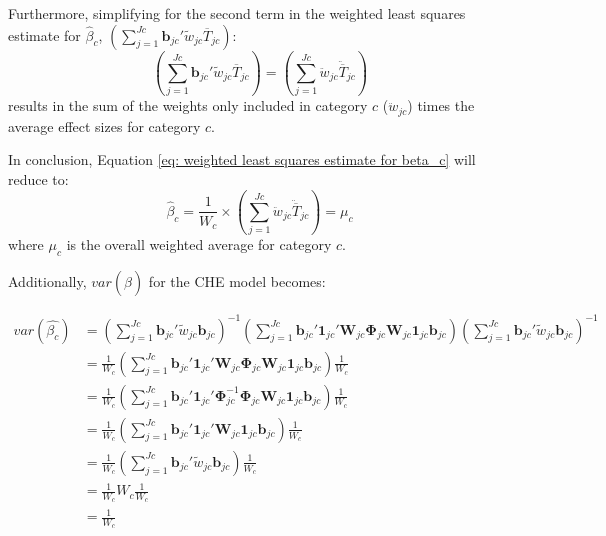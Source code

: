 Furthermore, simplifying for the second term in the weighted least squares estimate for $\hat{\beta}_c$, $\left(\sum_{j=1}^{Jc}\mathbf{b}_{jc}'\tilde{w}_{jc}\overline{T}_{jc} \right)$:
\begin{equation}
    \left(\sum_{j=1}^{Jc}\mathbf{b}_{jc}'\tilde{w}_{jc}\overline{T}_{jc} \right) = \left(\sum_{j=1}^{Jc} \ddot{w}_{jc} \ddot{\overline{T}}_{jc}\right) 
    \nonumber
\end{equation}
results in the sum of the weights only included in category $c$ ($\ddot{w}_{jc}$) times the average effect sizes for category $c$.

In conclusion, Equation \ref{eq: weighted least squares estimate for beta_c} will reduce to:
\begin{equation}
    \hat{\beta}_c = \frac{1}{W_c} \times \left(\sum_{j=1}^{Jc} \ddot{w}_{jc} \ddot{\overline{T}}_{jc}\right) = \mu_c
\end{equation}
where $\mu_c$ is the overall weighted average for category $c$.

Additionally, $var(\hat{\beta})$ for the CHE model becomes:

\begin{equation}
    \begin{split}
        var(\hat{\beta_c}) & = \left(\sum_{j=1}^{Jc}\mathbf{b}_{jc}'\tilde{w}_{jc} \mathbf{b}_{jc} \right)^{-1} \left(\sum_{j=1}^{Jc} \mathbf{b}_{jc}' \mathbf{1}_{jc}'\mathbf{W}_{jc} \mathbf{\Phi}_{jc} \mathbf{W}_{jc}\mathbf{1}_{jc}\mathbf{b}_{jc}   \right)\left(\sum_{j=1}^{Jc}\mathbf{b}_{jc}'\tilde{w}_{jc} \mathbf{b}_{jc} \right)^{-1} \\ 
        & = \frac{1}{W_c} \left(\sum_{j=1}^{Jc} \mathbf{b}_{jc}' \mathbf{1}_{jc}'\mathbf{W}_{jc} \mathbf{\Phi}_{jc} \mathbf{W}_{jc}\mathbf{1}_{jc}\mathbf{b}_{jc}   \right)\frac{1}{W_c} \\
        & = \frac{1}{W_c} \left(\sum_{j=1}^{Jc} \mathbf{b}_{jc}' \mathbf{1}_{jc}'\mathbf{\Phi}_{jc}^{-1} \mathbf{\Phi}_{jc} \mathbf{W}_{jc}\mathbf{1}_{jc}\mathbf{b}_{jc}   \right)\frac{1}{W_c} \\ 
        & = \frac{1}{W_c} \left(\sum_{j=1}^{Jc} \mathbf{b}_{jc}' \mathbf{1}_{jc}' \mathbf{W}_{jc}\mathbf{1}_{jc}\mathbf{b}_{jc}   \right)\frac{1}{W_c} \\ 
        & = \frac{1}{W_c} \left(\sum_{j=1}^{Jc} \mathbf{b}_{jc}' \tilde{w}_{jc}\mathbf{b}_{jc}   \right)\frac{1}{W_c} \\ 
        & = \frac{1}{W_c} W_c\frac{1}{W_c} \\ 
        & = \frac{1}{W_c} 
    \end{split}
\end{equation}



